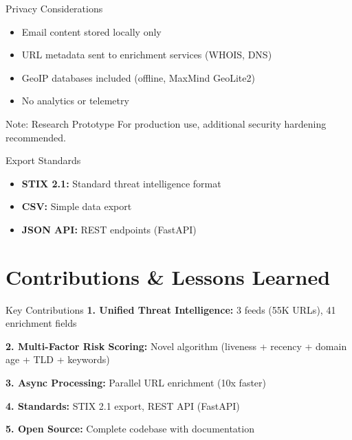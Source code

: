 \documentclass[aspectratio=169]{beamer}
\begin{document}
\begin{frame}{Privacy Considerations}
\small
\begin{itemize}
    \item Email content stored locally only
    \item URL metadata sent to enrichment services (WHOIS, DNS)
    \item GeoIP databases included (offline, MaxMind GeoLite2)
    \item No analytics or telemetry
\end{itemize}

\vspace{0.3cm}
\begin{block}{Note: Research Prototype}
\small
For production use, additional security hardening recommended.
\end{block}
\end{frame}

\begin{frame}{Export Standards}
\small
\begin{itemize}
    \item \textbf{STIX 2.1:} Standard threat intelligence format
    \item \textbf{CSV:} Simple data export
    \item \textbf{JSON API:} REST endpoints (FastAPI)
\end{itemize}
\end{frame}

\section{Contributions \& Lessons Learned}

\begin{frame}{Key Contributions}
\small
\textbf{1. Unified Threat Intelligence:} 3 feeds (55K URLs), 41 enrichment fields

\textbf{2. Multi-Factor Risk Scoring:} Novel algorithm (liveness + recency + domain age + TLD + keywords)

\textbf{3. Async Processing:} Parallel URL enrichment (10x faster)

\textbf{4. Standards:} STIX 2.1 export, REST API (FastAPI)

\textbf{5. Open Source:} Complete codebase with documentation
\end{frame}
\end{document}
